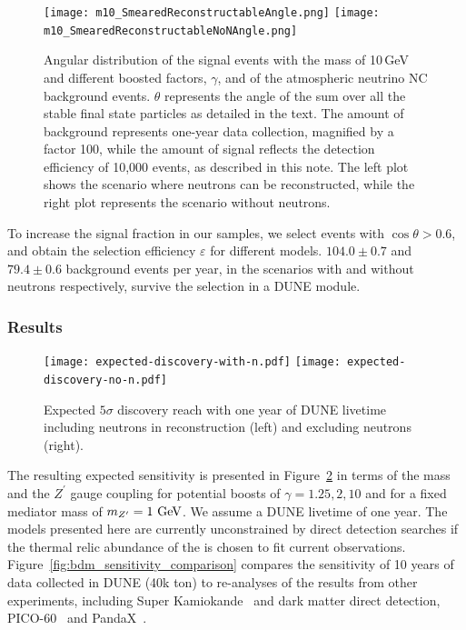 \begin{figure}[!htb]
\centering
\texttt{[image: m10\_SmearedReconstructableAngle.png]}
\texttt{[image: m10\_SmearedReconstructableNoNAngle.png]}
\caption[Angular distribution of the  signal events with the  mass of 10\,GeV]{Angular distribution of the  signal events with the  mass of 10\,GeV
and different boosted factors, $\gamma$, and of the atmospheric neutrino NC
background events.
$\theta$ represents the angle of the sum over all the stable final state
particles as detailed in the text.
The amount of background represents one-year data collection, magnified by a factor 100,
while the amount of signal reflects the detection efficiency of 10,000  events, as
described in this note.
The left plot shows the scenario where neutrons can be reconstructed,
while the right plot represents the scenario without neutrons.}
\label{fig:m10_SmearedReconstructableAngle}
\end{figure}


To increase the signal fraction in our samples, we select events with $\cos\theta > 0.6$,
and obtain the selection efficiency $\varepsilon$ for different  models.
$104.0 \pm 0.7$ and $79.4 \pm 0.6$ background events per year, in the scenarios with and without neutrons respectively,
survive the selection in a DUNE \nominalmodsize module.

\subsubsection{Results}

\begin{figure}[!htb]
\centering
\texttt{[image: expected-discovery-with-n.pdf]}\hspace{0.05\textwidth}
\texttt{[image: expected-discovery-no-n.pdf]}
\caption[Expected $5\sigma$ discovery reach with one year of DUNE livetime]{Expected $5\sigma$ discovery reach with one year of DUNE livetime including neutrons in reconstruction (left) and excluding neutrons (right).\label{fig:significance}}
\end{figure}
The resulting expected sensitivity is presented in Figure~\ref{fig:significance} in terms of the  mass and the $Z^\prime$ gauge coupling for potential  boosts of $\gamma = 1.25,2,10$ and for a fixed mediator mass of $m_{Z^\prime} = 1~{\rm GeV}$.  We assume a DUNE livetime of one year.  The models presented here are currently unconstrained by direct detection searches if the thermal relic abundance of the  is chosen to fit current observations.
Figure~\ref{fig:bdm_sensitivity_comparison} compares the sensitivity of 10 years of data collected in DUNE (40k ton) to re-analyses of the results from other experiments, including Super Kamiokande~\cite{Fechner:2009aa} and dark matter direct detection, PICO-60~\cite{Amole:2019fdf} and PandaX~\cite{Xia:2018qgs}. 

